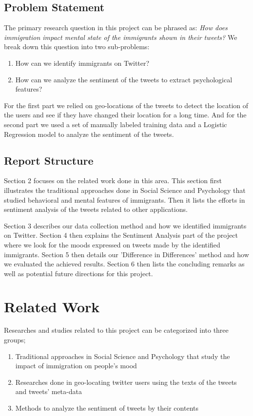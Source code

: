 \documentclass{article}
\begin{document}
\subsection{Problem Statement}

The primary research question in this project can be phrased as: \textit{How does immigration impact mental state of the immigrants shown in their tweets?} We break down this question into two sub-problems: 
\begin{enumerate}
    \item How can we identify immigrants on Twitter?
    \item How can we analyze the sentiment of the tweets to extract psychological features?
\end{enumerate}
For the first part we relied on geo-locations of the tweets to detect the location of the users and see if they have changed their location for a long time. And for the second part we used a set of manually labeled training data and a Logistic Regression model to analyze the sentiment of the tweets.   

\subsection{Report Structure}
Section 2 focuses on the related work done in this area. This section first illustrates the traditional approaches done in Social Science and Psychology that studied behavioral and mental features of immigrants. Then it lists the efforts in sentiment analysis of the tweets related to other applications. 

Section 3 describes our data collection method and how we identified immigrants on Twitter. Section 4 then explains the Sentiment Analysis part of the project where we look for the moods expressed on tweets made by the identified immigrants. Section 5 then details our 'Difference in Differences' method and how we evaluated the achieved results. Section 6 then lists the concluding remarks as well as potential future directions for this project. 

\section{Related Work}

Researches and studies related to this project can be categorized into three groups; 
\begin{enumerate}
    \item Traditional approaches in Social Science and Psychology that study the impact of immigration on people's mood
    \item Researches done in geo-locating twitter users using the texts of the tweets and tweets' meta-data
    \item Methods to analyze the sentiment of tweets by their contents
\end{enumerate}
\end{document}
